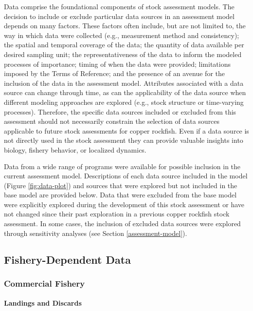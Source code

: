 \documentclass[11pt,
  english,
  letterpaper,
]{article}
\begin{document}
Data comprise the foundational components of stock assessment models. The decision to include or exclude particular data sources in an assessment model depends on many factors. These factors often include, but are not limited to, the way in which data were collected (e.g., measurement method and consistency); the spatial and temporal coverage of the data; the quantity of data available per desired sampling unit; the representativeness of the data to inform the modeled processes of importance; timing of when the data were provided; limitations imposed by the Terms of Reference; and the presence of an avenue for the inclusion of the data in the assessment model. Attributes associated with a data source can change through time, as can the applicability of the data source when different modeling approaches are explored (e.g., stock structure or time-varying processes). Therefore, the specific data sources included or excluded from this assessment should not necessarily constrain the selection of data sources applicable to future stock assessments for copper rockfish. Even if a data source is not directly used in the stock assessment they can provide valuable insights into biology, fishery behavior, or localized dynamics.

Data from a wide range of programs were available for possible inclusion in the current assessment model. Descriptions of each data source included in the model (Figure \ref{fig:data-plot}) and sources that were explored but not included in the base model are provided below. Data that were excluded from the base model were explicitly explored during the development of this stock assessment or have not changed since their past exploration in a previous copper rockfish stock assessment. In some cases, the inclusion of excluded data sources were explored through sensitivity analyses (see Section \ref{assessment-model}).

\hypertarget{fishery-dependent-data}{%
\subsection{Fishery-Dependent Data}\label{fishery-dependent-data}}

\hypertarget{commercial-fishery}{%
\subsubsection{Commercial Fishery}\label{commercial-fishery}}

\hypertarget{landings-and-discards}{%
\paragraph{Landings and Discards}\label{landings-and-discards}}
\end{document}
